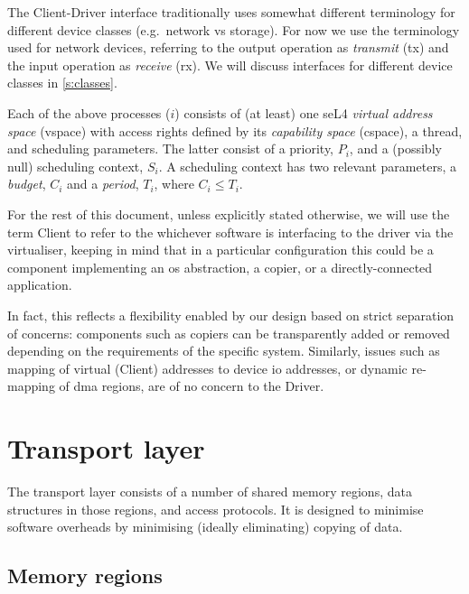 \documentclass[a4paper,12pt]{report}
\begin{document}
The Client-Driver interface traditionally uses somewhat different
terminology for different device classes (e.g.\ network vs
storage). For now we use the terminology used for network devices,
referring to the output operation as \emph{transmit} (\gls{tx}) and the
input operation as \emph{receive} (\gls{rx}). We will discuss interfaces for
different device classes in \autoref{s:classes}.

Each of the above processes (\(i\)) consists of (at least) one seL4
\emph{virtual address space} (\gls{vspace}) with access
rights defined by its \emph{capability space} (\gls{cspace}), a thread, and scheduling parameters. The
latter consist of a
priority, \(P_i\), and a (possibly null) scheduling context, \(S_i\). A
scheduling context has two relevant parameters, a \emph{budget},
\(C_i\) and a \emph{period}, \(T_i\), where \(C_i \leq T_i\).

For the rest of this document, unless explicitly stated otherwise, we
will use the term Client to refer to the whichever software is
interfacing to the driver via the virtualiser, keeping in mind that in a particular
configuration this could be a component implementing an
\gls{os} abstraction, a copier, or a directly-connected
application.

In fact, this reflects a flexibility enabled by our design based on
strict separation of concerns: components such as copiers can
be transparently added or removed depending on the requirements of the
specific system. Similarly, issues such as mapping of virtual (Client)
addresses to device \gls{io} addresses, or dynamic re-mapping of \gls{dma} regions,
are of no concern to the Driver.

\section{Transport layer}\label{s:transport}

The transport layer consists of a number of shared memory regions,
data structures in those regions, and access protocols. It is designed
to minimise software overheads by minimising (ideally eliminating)
copying of data.

\subsection{Memory regions}\label{s:regs}
\end{document}
